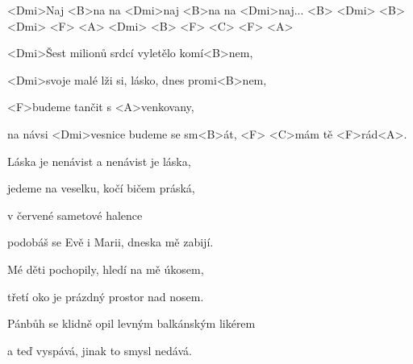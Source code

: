 
\zr

<Dmi>Naj <B>na na <Dmi>naj <B>na na <Dmi>naj...
 <B> <Dmi> <B> <Dmi> <F> <A> <Dmi>
 <B> <F> <C> <F> <A>

\kr
\zs

<Dmi>Šest milionů srdcí vyletělo komí<B>nem,

<Dmi>svoje malé lži si, lásko, dnes promi<B>nem,

<F>budeme tančit s <A>venkovany,

na návsi <Dmi>vesnice budeme se sm<B>át, <F> <C>mám tě <F>rád<A>.

\ks

\zr \kr

\zs

Láska je nenávist a nenávist je láska,

jedeme na veselku, kočí bičem práská,

v červené sametové halence

podobáš se Evě i Marii, dneska mě zabijí.

\ks

\zr \kr

\zs

Mé děti pochopily, hledí na mě úkosem,

třetí oko je prázdný prostor nad nosem.

Pánbůh se klidně opil levným balkánským likérem

a teď vyspává, jinak to smysl nedává.

\ks

\zr
\kr

\kp
